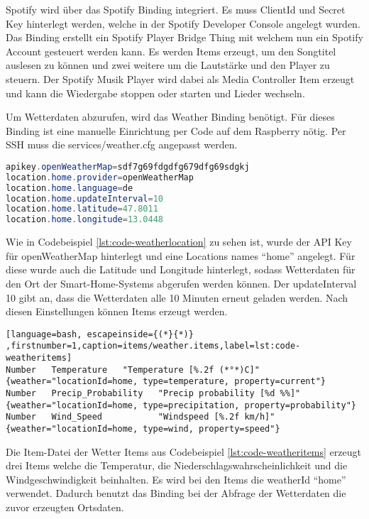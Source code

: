		Spotify wird über das Spotify Binding integriert. Es muss ClientId und Secret Key hinterlegt werden, welche in der Spotify Developer Console angelegt wurden. Das Binding erstellt ein Spotify Player Bridge Thing mit welchem nun ein Spotify Account gesteuert werden kann. Es werden Items erzeugt, um den Songtitel auslesen zu können und zwei weitere um die Lautstärke und den Player zu steuern. Der Spotify Musik Player wird dabei als Media Controller Item erzeugt und kann die Wiedergabe stoppen oder starten und Lieder wechseln.
		
		Um Wetterdaten abzurufen, wird das Weather Binding benötigt. Für dieses Binding ist eine manuelle Einrichtung per Code auf dem Raspberry nötig. Per SSH muss die services/weather.cfg angepasst werden.
		
		\begin{lstlisting}[language=java,firstnumber=1,caption=services/weather.cfg,label=lst:code-weatherlocation]
apikey.openWeatherMap=sdf7g69fdgdfg679dfg69sdgkj
location.home.provider=openWeatherMap
location.home.language=de
location.home.updateInterval=10
location.home.latitude=47.8011
location.home.longitude=13.0448
		\end{lstlisting}
		
		Wie in Codebeispiel \ref{lst:code-weatherlocation} zu sehen ist, wurde der API Key für openWeatherMap hinterlegt und eine Locations names "`home"' angelegt. Für diese wurde auch die Latitude und Longitude hinterlegt, sodass Wetterdaten für den Ort der Smart-Home-Systems abgerufen werden können. Der updateInterval 10 gibt an, dass die Wetterdaten alle 10 Minuten erneut geladen werden.
		Nach diesen Einstellungen können Items erzeugt werden.
		
				\begin{lstlisting}[language=bash, escapeinside={(*}{*)} ,firstnumber=1,caption=items/weather.items,label=lst:code-weatheritems]
Number   Temperature   "Temperature [%.2f (*°*)C]"
{weather="locationId=home, type=temperature, property=current"}
Number   Precip_Probability   "Precip probability [%d %%]"
{weather="locationId=home, type=precipitation, property=probability"}
Number   Wind_Speed           "Windspeed [%.2f km/h]"
{weather="locationId=home, type=wind, property=speed"}
		\end{lstlisting}
		
		Die Item-Datei der Wetter Items aus Codebeispiel \ref{lst:code-weatheritems} erzeugt drei Items welche die Temperatur, die Niederschlagswahrscheinlichkeit und die Windgeschwindigkeit beinhalten.
		Es wird bei den Items die weatherId "`home"' verwendet. Dadurch benutzt das Binding bei der Abfrage der Wetterdaten die zuvor erzeugten Ortsdaten.
		
